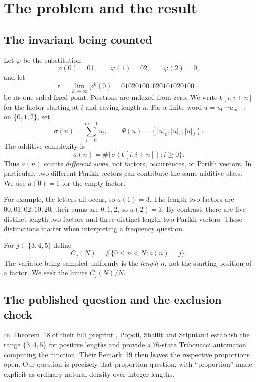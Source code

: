 \documentclass[11pt,a4paper]{article}
\theoremstyle{definition}
\theoremstyle{remark}
\newcommand{\ttt}{\mathbf t}
\begin{document}
{\small\setlength{\parskip}{0pt}\tableofcontents}
\newpage

\section{The problem and the result}
\label{sec:intro}

\subsection{The invariant being counted}
Let $\varphi$ be the substitution
\begin{equation}\label{eq:phi}
 \varphi(0)=01,\qquad \varphi(1)=02,\qquad \varphi(2)=0,
\end{equation}
and let
\[
 \ttt=\lim_{k\to\infty}\varphi^k(0)
      =010201001020101020100\cdots
\]
be its one-sided fixed point. Positions are indexed from zero. We write
$\ttt[i:i+n]$ for the factor starting at $i$ and having length $n$.
For a finite word $u=u_0\cdots u_{m-1}$ on $\{0,1,2\}$, set
\[
 \sigma(u)=\sum_{i=0}^{m-1}u_i,
 \qquad
 \Psi(u)=(|u|_0,|u|_1,|u|_2).
\]
The additive complexity is
\begin{equation}\label{eq:additive}
 a(n)=\#\{\sigma(\ttt[i:i+n]):i\ge0\}.
\end{equation}
Thus $a(n)$ counts \emph{different sums}, not factors, occurrences, or
Parikh vectors. In particular, two different Parikh vectors can contribute
the same additive class. We use $a(0)=1$ for the empty factor.

For example, the letters all occur, so $a(1)=3$. The length-two factors are
$00,01,02,10,20$; their sums are $0,1,2$, so $a(2)=3$. By contrast, there
are five distinct length-two factors and three distinct length-two Parikh
vectors. These distinctions matter when interpreting a frequency question.

For $j\in\{3,4,5\}$ define
\begin{equation}\label{eq:countdef}
 C_j(N)=\#\{0\le n<N:a(n)=j\}.
\end{equation}
The variable being sampled uniformly is the \emph{length} $n$, not the
starting position of a factor. We seek the limits $C_j(N)/N$.

\subsection{The published question and the exclusion check}
In Theorem~18 of their full preprint \cite{PSS}, Popoli, Shallit and
Stipulanti establish the range $\{3,4,5\}$ for positive lengths and provide
a 76-state Tribonacci automaton computing the function. Their Remark~19
then leaves the respective proportions open. Our question is precisely
that proportion question, with ``proportion'' made explicit as ordinary
natural density over integer lengths.
\end{document}
